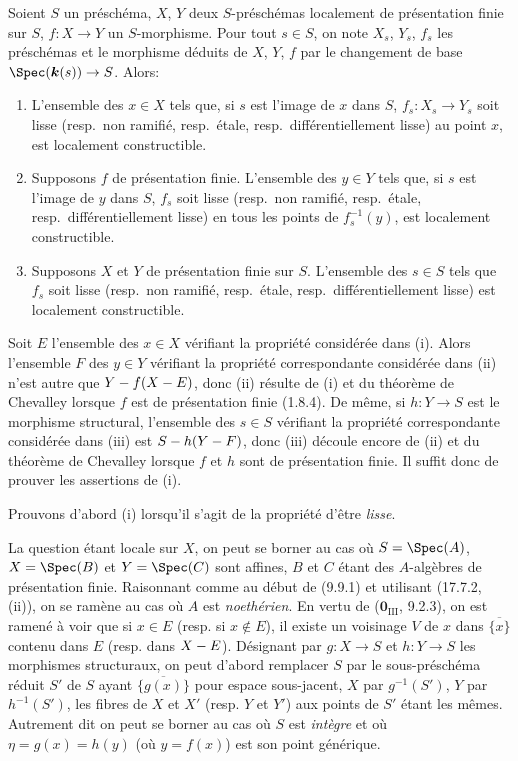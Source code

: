 \begin{proposition}[17.7.11]
\label{IV.17.7.11}
Soient $S$ un préschéma, $X$, $Y$ deux $S$-préschémas localement de présentation finie sur $S$, $f:X\to Y$ un $S$-morphisme. Pour tout $s\in S$, on note $X_s$, $Y_s$, $f_s$ les préschémas et le morphisme déduits de $X$, $Y$, $f$ par le changement de base $\Spec(\boldsymbol{k}(s))\to S$. Alors:
\begin{enumerate}
  \item[\textup{(i)}] L'ensemble des $x\in X$ tels que, si $s$ est l'image de $x$ dans $S$, $f_s:X_s\to Y_s$ soit lisse \textup{(resp.}\ non ramifié, \textup{resp.}\ étale, \textup{resp.}\ différentiellement lisse\textup{)} au point $x$, est localement constructible.
  \item[\textup{(ii)}] Supposons $f$ de présentation finie. L'ensemble des $y\in Y$ tels que, si $s$ est l'image de $y$ dans $S$, $f_s$ soit lisse \textup{(resp.}\ non ramifié, \textup{resp.}\ étale, \textup{resp.}\ différentiellement lisse\textup{)} en tous les points de $f_s^{-1}(y)$, est localement constructible.
  \item[\textup{(iii)}] Supposons $X$ et $Y$ de présentation finie sur $S$. L'ensemble des $s\in S$ tels que $f_s$ soit lisse \textup{(resp.}\ non ramifié, \textup{resp.}\ étale, \textup{resp.}\ différentiellement lisse\textup{)} est localement constructible.
\end{enumerate}
\end{proposition}

Soit $E$ l'ensemble des $x\in X$ vérifiant la propriété considérée dans (i). Alors l'ensemble $F$ des $y\in Y$ vérifiant la propriété correspondante considérée dans (ii) n'est
autre que $Y- f(X- E)$, donc (ii) résulte de (i) et du théorème de Chevalley lorsque $f$ est de présentation finie (1.8.4). De même, si $h:Y\to S$ est le morphisme structural, l'ensemble des $s\in S$ vérifiant la propriété correspondante considérée dans (iii) est $S- h(Y- F)$, donc (iii) découle encore de (ii) et du théorème de Chevalley lorsque $f$ et $h$ sont de présentation finie. Il suffit donc de prouver les assertions de (i).

Prouvons d'abord (i) lorsqu'il s'agit de la propriété d'être \emph{lisse}.

La question étant locale sur $X$, on peut se borner au cas où $S=\Spec(A)$, $X=\Spec(B)$ et $Y=\Spec(C)$ sont affines, $B$ et $C$ étant des $A$-algèbres de présentation finie. Raisonnant comme au début de (9.9.1) et utilisant (17.7.2, (ii)), on se ramène au cas où $A$ est \emph{noethérien}. En vertu de ($\mathbf{0}_{\mathrm{III}}$, 9.2.3), on est ramené à voir que si $x\in E$ (resp. si $x\notin E$), il existe un voisinage $V$ de $x$ dans $\overline{\{x\}}$ contenu dans $E$ (resp. dans $X- E$). Désignant par $g:X\to S$ et $h:Y\to S$ les morphismes structuraux, on peut d'abord remplacer $S$ par le sous-préschéma réduit $S'$ de $S$ ayant $\overline{\{g(x)\}}$ pour espace sous-jacent, $X$ par $g^{-1}(S')$, $Y$ par $h^{-1}(S')$, les fibres de $X$ et $X'$ (resp. $Y$ et $Y'$) aux points de $S'$ étant les mêmes. Autrement dit on peut se borner au cas où $S$ est \emph{intègre} et où $\eta=g(x)=h(y)$ (où $y=f(x)$) est son point générique.


